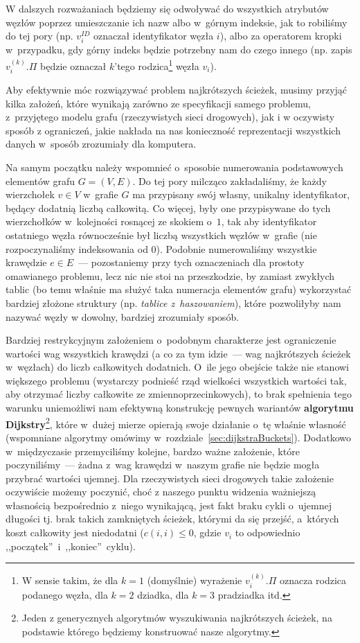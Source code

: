 W dalszych rozważaniach będziemy się odwoływać do wszystkich atrybutów węzłów poprzez umieszczanie ich nazw albo w~górnym indeksie, jak to robiliśmy do tej pory (np. $v_{i}^{ID}$ oznaczał identyfikator węzła $i$), albo za operatorem kropki w~przypadku, gdy górny indeks będzie potrzebny nam do czego innego (np. zapis $v_{i}^{ \left( k \right) }.\Pi$ będzie oznaczał $k$'tego rodzica\footnote{
	W sensie takim, że dla $k=1$ (domyślnie) wyrażenie $v_{i}^{ \left( k \right) }.\Pi$ oznacza rodzica podanego węzła, dla $k=2$ dziadka, dla $k=3$ pradziadka itd.
} węzła $v_{i}$).

Aby efektywnie móc rozwiązywać problem najkrótszych ścieżek, musimy przyjąć kilka założeń, które wynikają zarówno ze specyfikacji samego problemu, z~przyjętego modelu grafu (rzeczywistych sieci drogowych), jak i w oczywisty sposób z ograniczeń, jakie nakłada na nas konieczność reprezentacji wszystkich danych w~sposób zrozumiały dla komputera.

Na samym początku należy wspomnieć o~sposobie numerowania podstawowych elementów grafu $G = \left( V, E \right)$.
Do tej pory milcząco zakładaliśmy, że każdy wierzchołek $v \in V$ w~grafie $G$ ma przypisany swój własny, unikalny identyfikator, będący dodatnią liczbą całkowitą.
Co więcej, były one przypisywane do tych wierzchołków w~kolejności rosnącej ze skokiem o~$1$, tak aby identyfikator ostatniego węzła równocześnie był liczbą wszystkich węzłów w~grafie (nie rozpoczynaliśmy indeksowania od $0$).
Podobnie numerowaliśmy wszystkie krawędzie $e \in E$~--- pozostaniemy przy tych oznaczeniach dla prostoty omawianego problemu, lecz nic nie stoi na przeszkodzie, by zamiast zwykłych tablic (bo temu właśnie ma służyć taka numeracja elementów grafu) wykorzystać bardziej złożone struktury (np. \textit{tablice z~haszowaniem}), które pozwoliłyby nam nazywać węzły w dowolny, bardziej zrozumiały sposób.

Bardziej restrykcyjnym założeniem o~podobnym charakterze jest ograniczenie wartości wag wszystkich krawędzi (a co za tym idzie~--- wag najkrótszych ścieżek w~węzłach) do liczb całkowitych dodatnich.
O~ile jego obejście także nie stanowi większego problemu (wystarczy podnieść rząd wielkości wszystkich wartości tak, aby otrzymać liczby całkowite ze zmiennoprzecinkowych), to brak spełnienia tego warunku uniemożliwi nam efektywną konstrukcję pewnych wariantów \textbf{algorytmu Dijkstry}\footnote{
	Jeden z generycznych algorytmów wyszukiwania najkrótszych ścieżek, na podstawie którego będziemy konstruować nasze algorytmy.
}, które w~dużej mierze opierają swoje działanie o~tę właśnie własność (wspomniane algorytmy omówimy w~rozdziale~\ref{sec:dijkstraBuckets}).
Dodatkowo w~międzyczasie przemyciliśmy kolejne, bardzo ważne założenie, które poczyniliśmy~--- żadna z~wag krawędzi w~naszym grafie nie będzie mogła przybrać wartości ujemnej.
Dla rzeczywistych sieci drogowych takie założenie oczywiście możemy poczynić, choć z naszego punktu widzenia ważniejszą własnością bezpośrednio z~niego wynikającą, jest fakt braku cykli o~ujemnej długości tj. brak takich zamkniętych ścieżek, którymi da się przejść, a~których koszt całkowity jest niedodatni ($ c \left( i, i \right) \leqslant 0$, gdzie $v_{i}$ to odpowiednio ,,początek''~i~,,koniec''~cyklu). 

